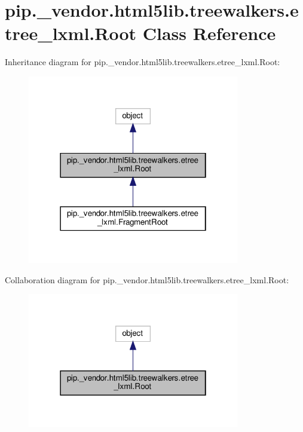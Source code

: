 \hypertarget{classpip_1_1__vendor_1_1html5lib_1_1treewalkers_1_1etree__lxml_1_1Root}{}\section{pip.\+\_\+vendor.\+html5lib.\+treewalkers.\+etree\+\_\+lxml.\+Root Class Reference}
\label{classpip_1_1__vendor_1_1html5lib_1_1treewalkers_1_1etree__lxml_1_1Root}


Inheritance diagram for pip.\+\_\+vendor.\+html5lib.\+treewalkers.\+etree\+\_\+lxml.\+Root\+:
\nopagebreak
\begin{figure}[H]
\begin{center}
\leavevmode
\includegraphics[width=262pt]{classpip_1_1__vendor_1_1html5lib_1_1treewalkers_1_1etree__lxml_1_1Root__inherit__graph}
\end{center}
\end{figure}


Collaboration diagram for pip.\+\_\+vendor.\+html5lib.\+treewalkers.\+etree\+\_\+lxml.\+Root\+:
\nopagebreak
\begin{figure}[H]
\begin{center}
\leavevmode
\includegraphics[width=262pt]{classpip_1_1__vendor_1_1html5lib_1_1treewalkers_1_1etree__lxml_1_1Root__coll__graph}
\end{center}
\end{figure}
